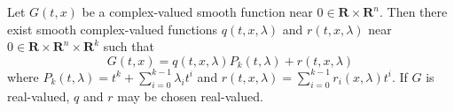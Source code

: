 Let $G(t, x)$ be a complex-valued smooth function near $0 \in \mathbf{R} \times \mathbf{R}^n$. Then there exist smooth complex-valued functions $q(t, x, \lambda)$ and $r(t, x, \lambda)$ near $0 \in \mathbf{R} \times \mathbf{R}^n \times \mathbf{R}^k$ such that
$$G(t, x) = q(t, x, \lambda) P_k(t, \lambda) + r(t, x, \lambda)$$
where $P_k(t, \lambda) = t^k + \sum_{i=0}^{k-1} \lambda_i t^i$ and $r(t, x, \lambda) = \sum_{i=0}^{k-1} r_i(x, \lambda) t^i$. If $G$ is real-valued, $q$ and $r$ may be chosen real-valued.
